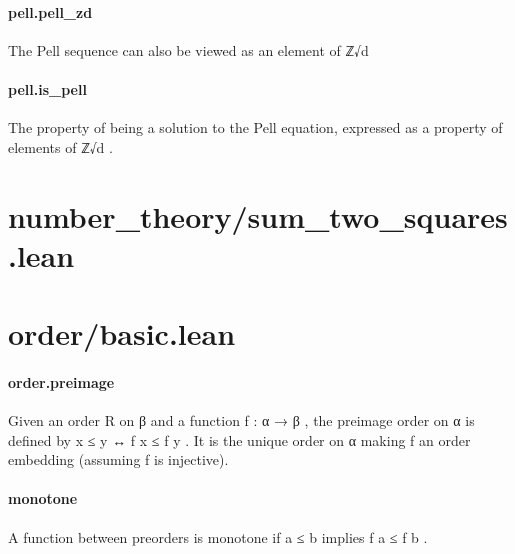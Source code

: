 \documentclass{article}
\begin{document}
\paragraph{pell.pell\_zd}
\par
The Pell sequence can also be viewed as an element of 
\colorbox[RGB]{253,246,227}{{{{\color[RGB]{101, 123, 131} ℤ√d }}}}\paragraph{pell.is\_pell}
\par
The property of being a solution to the Pell equation, expressed
as a property of elements of 
\colorbox[RGB]{253,246,227}{{{{\color[RGB]{101, 123, 131} ℤ√d }}}}.
\section{number\_theory/sum\_two\_squares.lean}\section{order/basic.lean}\paragraph{order.preimage}
\par
Given an order 
\colorbox[RGB]{253,246,227}{{{{\color[RGB]{101, 123, 131} R }}}} on 
\colorbox[RGB]{253,246,227}{{{{\color[RGB]{101, 123, 131} β }}}} and a function 
\colorbox[RGB]{253,246,227}{{{{\color[RGB]{101, 123, 131} f : α  }}}{{{\color[RGB]{133, 153, 0} → }}}{{{\color[RGB]{101, 123, 131}  β }}}},
the preimage order on 
\colorbox[RGB]{253,246,227}{{{{\color[RGB]{101, 123, 131} α }}}} is defined by 
\colorbox[RGB]{253,246,227}{{{{\color[RGB]{101, 123, 131} x  }}}{{{\color[RGB]{181, 137, 0} ≤ }}}{{{\color[RGB]{101, 123, 131}  y  }}}{{{\color[RGB]{181, 137, 0} ↔ }}}{{{\color[RGB]{101, 123, 131}  f x  }}}{{{\color[RGB]{181, 137, 0} ≤ }}}{{{\color[RGB]{101, 123, 131}  f y }}}}.
It is the unique order on 
\colorbox[RGB]{253,246,227}{{{{\color[RGB]{101, 123, 131} α }}}} making 
\colorbox[RGB]{253,246,227}{{{{\color[RGB]{101, 123, 131} f }}}} an order embedding
(assuming 
\colorbox[RGB]{253,246,227}{{{{\color[RGB]{101, 123, 131} f }}}} is injective).
\paragraph{monotone}
\par
A function between preorders is monotone if
\colorbox[RGB]{253,246,227}{{{{\color[RGB]{101, 123, 131} a  }}}{{{\color[RGB]{181, 137, 0} ≤ }}}{{{\color[RGB]{101, 123, 131}  b }}}} implies 
\colorbox[RGB]{253,246,227}{{{{\color[RGB]{101, 123, 131} f a  }}}{{{\color[RGB]{181, 137, 0} ≤ }}}{{{\color[RGB]{101, 123, 131}  f b }}}}.
\end{document}
